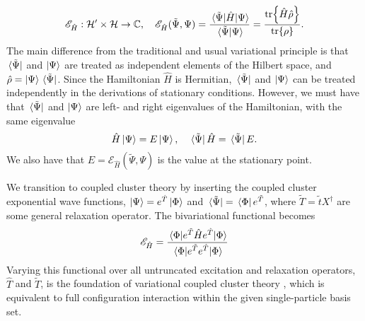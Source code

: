\begin{equation}
    \label{eq:bivariational_principle}
    \mathscr{E}_{\hat{H}} : \mathcal{H}' \times \mathcal{H} \to \mathbb{C},
    \quad
    \mathscr{E}_{\hat{H}}(\tilde{\Psi}, \Psi) 
        = \frac{\mel*{\tilde{\Psi}}{\hat{H}}{\Psi}}{\braket*{\tilde{\Psi}}{\Psi}}
        = \frac{\tr{\hat{H}\hat{\rho}}}{\tr{\rho}}.
\end{equation}
The main difference from the traditional and usual variational principle is that 
$\bra*{\tilde{\Psi}}$ and $\ket{\Psi}$ are treated as independent elements of the
Hilbert space, and $\hat{\rho} = \ket{\Psi}\bra*{\tilde{\Psi}}$.
Since the Hamiltonian $\hat{H}$ is Hermitian, $\bra*{\tilde{\Psi}}$ and $\ket{\Psi}$
can be treated 
independently in the derivations of stationary conditions. However, we must have that
$\bra*{\tilde{\Psi}}$ and $\ket{\Psi}$ are left- 
and right eigenvalues of the Hamiltonian, with the same eigenvalue
\begin{equation}
    \hat{H}\ket{\Psi} = E\ket{\Psi}, \quad \bra*{\tilde{\Psi}}\hat{H} = \bra*{\tilde{\Psi}}E.
\end{equation}
We also have that $E = \mathcal{E}_{\hat{H}}(\tilde{\Psi}, \Psi)$ is the value at the
stationary point.

We transition to coupled cluster theory by inserting the coupled cluster exponential 
wave functions, $\ket{\Psi} = e^{\hat{T}}\ket{\Phi}$ and 
$\bra*{\tilde{\Psi}} = \bra*{\Phi}e^{\tilde{T}}$, where 
$\tilde{T} = \tilde{t}X^\dagger$ are some general relaxation operator. The 
bivariational functional becomes 
\begin{equation}
    \label{eq:bivariational_principle_cc}
    \mathscr{E}_{\hat{H}} 
    = \frac{\mel{\Phi}{e^{\tilde{T}}\hat{H}e^{\hat{T}}}{\Phi}}
        {\mel{\Phi}{e^{\tilde{T}}e^{\hat{T}}}{\Phi}}
\end{equation}
Varying this functional over all untruncated excitation and relaxation operators,
$\hat{T}$ and $\tilde{T}$, is the foundation of variational coupled cluster
theory \cite{bartlett1988expectation}, which is equivalent to full configuration 
interaction within the given single-particle basis set.

